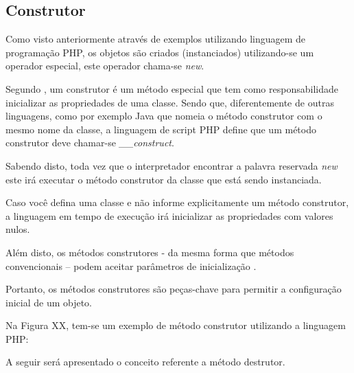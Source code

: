 \subsection{Construtor}

Como visto anteriormente através de exemplos utilizando linguagem de
programação PHP, os objetos são criados (instanciados) utilizando-se um
operador especial, este operador chama-se \textit{new}.

Segundo , um construtor é um método especial que tem
como responsabilidade inicializar as propriedades de uma classe. Sendo que,
diferentemente de outras linguagens, como por exemplo Java que nomeia o  método
construtor com o mesmo nome da classe, a linguagem de script \acs{PHP} define que um
método construtor deve chamar-se \textit{\_\_construct}.

Sabendo disto, toda vez que o interpretador encontrar a palavra reservada
\textit{new} este irá executar o método construtor da classe que está sendo
instanciada.

Caso você defina uma classe e não informe explicitamente um método construtor, a
linguagem em tempo de execução irá inicializar as propriedades com valores nulos.

Além disto, os métodos construtores - da mesma forma que métodos convencionais –
podem aceitar parâmetros de inicialização \cite{learningJava}.

Portanto, os métodos construtores são peças-chave para permitir a configuração
inicial de um objeto.

Na Figura XX, tem-se um exemplo de método construtor utilizando
a linguagem PHP:

A seguir será apresentado o conceito referente a método destrutor.